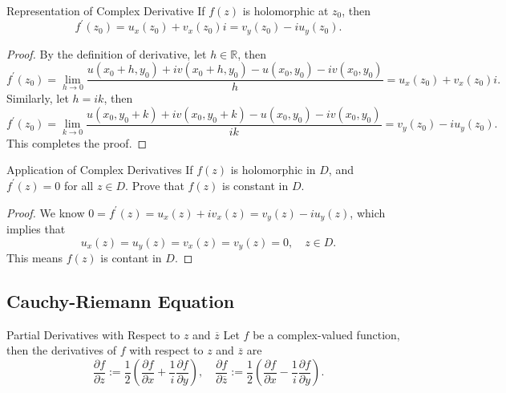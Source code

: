 \begin{proposition}{Representation of Complex Derivative}{}
  If $f(z)$ is holomorphic at $z_0$, then
  \begin{equation}
    f^{\prime}(z_0) = u_x(z_0) + v_x(z_0) i = v_y(z_0) - iu_y(z_0).
  \end{equation}
\end{proposition}

\begin{proof}
  By the definition of derivative, let $h \in \mathbb{R}$, then
  \begin{equation}
    f^{\prime}(z_0) = \lim \limits _{h \rightarrow 0} \frac{u(x_0+h, y_0) + i v(x_0 + h, y_0) - u(x_0, y_0) - iv(x_0, y_0)}{h}
    = u_x(z_0) + v_x(z_0)i.
  \end{equation}
  Similarly, let $h = ik$, then
  \begin{equation}
    f^{\prime}(z_0) = \lim \limits _{k \rightarrow 0} \frac{u(x_0,y_0+k) + i v(x_0, y_0 + k) - u(x_0,y_0) - iv(x_0,y_0)}{ik}
    = v_y(z_0) - iu_y(z_0).
  \end{equation}
  This completes the proof.
\end{proof}

\begin{example}{Application of Complex Derivatives}{}
  If $f(z)$ is holomorphic in $D$, and $f^{\prime}(z) = 0$ for all $z \in D$.
  Prove that $f(z)$ is constant in $D$.
\end{example}

\begin{proof}
  We know $0 = f^{\prime}(z) = u_x(z)+iv_x(z) = v_y(z)-iu_y(z)$,
  which implies that 
  \begin{equation}
    u_x(z) = u_y(z) = v_x(z) = v_y(z) = 0, \quad z \in D.
  \end{equation}
  This means $f(z)$ is contant in $D$.
\end{proof}

\subsection{Cauchy-Riemann Equation}

\begin{definition}{Partial Derivatives with Respect to $z$ and $\overline{z}$}{}
  Let $f$ be a complex-valued function,
  then the derivatives of $f$ with respect to $z$ and $\overline{z}$ are
  \begin{equation}
    \frac{\partial f}{\partial z} := \frac{1}{2} \left( \frac{\partial f}{\partial x} + \frac{1}{i} \frac{\partial f}{\partial y} \right), \quad
    \frac{\partial f}{\partial \overline{z}} := \frac{1}{2} \left( \frac{\partial f}{\partial x} - \frac{1}{i} \frac{\partial f}{\partial y} \right).
  \end{equation}
\end{definition}

